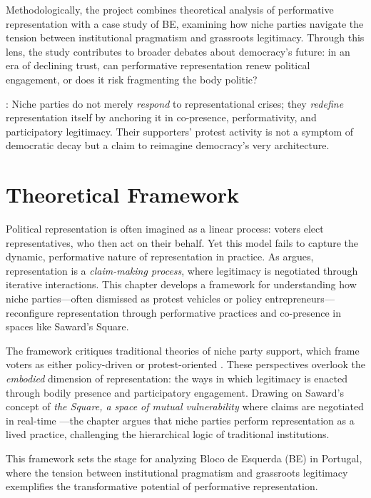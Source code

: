 \begin{greenenv}
	Methodologically, the project combines theoretical analysis of performative representation with a case study of BE, examining how niche parties navigate the tension between institutional pragmatism and grassroots legitimacy. Through this lens, the study contributes to broader debates about democracy’s future: in an era of declining trust, can performative representation renew political engagement, or does it risk fragmenting the body politic?

	: Niche parties do not merely \textit{respond} to representational crises; they \textit{redefine} representation itself by anchoring it in co-presence, performativity, and participatory legitimacy. Their supporters’ protest activity is not a symptom of democratic decay but a claim to reimagine democracy’s very architecture.

\end{greenenv}

\chapter{Theoretical Framework}\label{chap:Theoretical Framework} %
\begin{greenenv}
	Political representation is often imagined as a linear process: voters elect representatives, who then act on their behalf. Yet this model fails to capture the dynamic, performative nature of representation in practice. As \textcite{saward2010} argues, representation is a \textit{claim-making process}, where legitimacy is negotiated through iterative interactions. This chapter develops a framework for understanding how niche parties—often dismissed as protest vehicles or policy entrepreneurs—reconfigure representation through performative practices and co-presence in spaces like Saward’s Square.

	The framework critiques traditional theories of niche party support, which frame voters as either policy-driven or protest-oriented \parencite{meguid2005, nonnemacher2023}. These perspectives overlook the \textit{embodied} dimension of representation: the ways in which legitimacy is enacted through bodily presence and participatory engagement. Drawing on Saward’s concept of \textit{the Square, a space of mutual vulnerability} where claims are negotiated in real-time \parencite[5]{saward2024}—the chapter argues that niche parties perform representation as a lived practice, challenging the hierarchical logic of traditional institutions.

	This framework sets the stage for analyzing Bloco de Esquerda (BE) in Portugal, where the tension between institutional pragmatism and grassroots legitimacy exemplifies the transformative potential of performative representation.
\end{greenenv}
